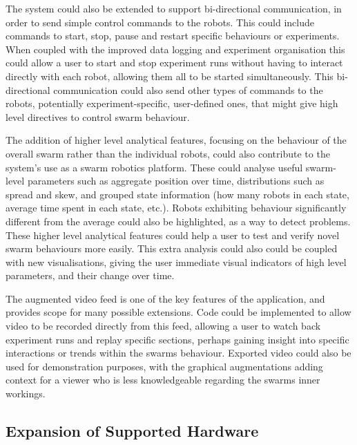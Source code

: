 The system could also be extended to support bi-directional communication, in order to send simple control commands to the robots. This could include commands to start, stop, pause and restart specific behaviours or experiments. When coupled with the improved data logging and experiment organisation this could allow a user to start and stop experiment runs without having to interact directly with each robot, allowing them all to be started simultaneously. This bi-directional communication could also send other types of commands to the robots, potentially experiment-specific, user-defined ones, that might give high level directives to control swarm behaviour.

The addition of higher level analytical features, focusing on the behaviour of the overall swarm rather than the individual robots, could also contribute to the system's use as a swarm robotics platform. These could analyse useful swarm-level parameters such as aggregate position over time, distributions such as spread and skew, and grouped state information (how many robots in each state, average time spent in each state, etc.). Robots exhibiting behaviour significantly different from the average could also be highlighted, as a way to detect problems. These higher level analytical features could help a user to test and verify novel swarm behaviours more easily. This extra analysis could also could be coupled with new visualisations, giving the user immediate visual indicators of high level parameters, and their change over time.

The augmented video feed is one of the key features of the application, and provides scope for many possible extensions. Code could be implemented to allow video to be recorded directly from this feed, allowing a user to watch back experiment runs and replay specific sections, perhaps gaining insight into specific interactions or trends within the swarms behaviour. Exported video could also be used for demonstration purposes, with the graphical augmentations adding context for a viewer who is less knowledgeable regarding the swarms inner workings.


\subsection{Expansion of Supported Hardware}

